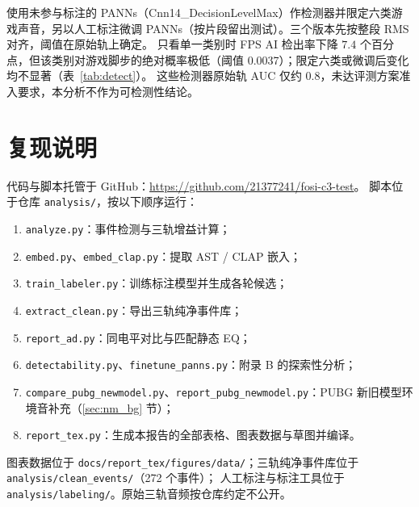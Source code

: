 \documentclass[11pt,a4paper]{ctexart}
\begin{document}
使用未参与标注的 PANNs（Cnn14\_DecisionLevelMax）作检测器并限定六类游戏声音，另以人工标注微调 PANNs（按片段留出测试）。三个版本先按整段 RMS 对齐，阈值在原始轨上确定。
只看单一类别时 FPS AI 检出率下降 $7.4$ 个百分点，但该类别对游戏脚步的绝对概率极低（阈值 0.0037）；限定六类或微调后变化均不显著（表~\ref{tab:detect}）。
这些检测器原始轨 AUC 仅约 0.8，未达评测方案准入要求，本分析不作为可检测性结论。



\section{复现说明}
代码与脚本托管于 GitHub：\url{https://github.com/21377241/fosi-c3-test}。
脚本位于仓库 \texttt{analysis/}，按以下顺序运行：
\begin{enumerate}
\item \texttt{analyze.py}：事件检测与三轨增益计算；
\item \texttt{embed.py}、\texttt{embed\_clap.py}：提取 AST / CLAP 嵌入；
\item \texttt{train\_labeler.py}：训练标注模型并生成各轮候选；
\item \texttt{extract\_clean.py}：导出三轨纯净事件库；
\item \texttt{report\_ad.py}：同电平对比与匹配静态 EQ；
\item \texttt{detectability.py}、\texttt{finetune\_panns.py}：附录 B 的探索性分析；
\item \texttt{compare\_pubg\_newmodel.py}、\texttt{report\_pubg\_newmodel.py}：PUBG 新旧模型环境音补充（\ref{sec:nm_bg} 节）；
\item \texttt{report\_tex.py}：生成本报告的全部表格、图表数据与草图并编译。
\end{enumerate}
图表数据位于 \texttt{docs/report\_tex/figures/data/}；三轨纯净事件库位于 \texttt{analysis/clean\_events/}（272 个事件）；
人工标注与标注工具位于 \texttt{analysis/labeling/}。原始三轨音频按仓库约定不公开。
\end{document}
